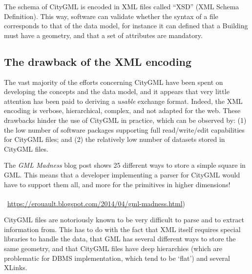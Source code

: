 The schema of CityGML is encoded in XML files called ``XSD'' (XML Schema Definition).
This way, software can validate whether the syntax of a file corresponds to that of the data model, for instance it can defined that a Building must have a geometry, and that a set of attributes are mandatory.




\subsection{The drawback of the XML encoding}

The vast majority of the efforts concerning CityGML have been spent on developing the concepts and the data model, and it appears that very little attention has been paid to deriving a \emph{usable} exchange format.
Indeed, the XML encoding is verbose, hierarchical, complex, and not adapted for the web.
These drawbacks hinder the use of CityGML in practice, which can be observed by: (1) the low number of software packages supporting full read/write/edit capabilities for CityGML files; and (2) the relatively low number of datasets stored in CityGML files.

\begin{kaobox-toread}[frametitle=\faExclamationTriangle\ GML madness]
  The \emph{GML Madness} blog post shows 25 different ways to store a simple square in GML. 
  This means that a developer implementing a parser for CityGML would have to support them all, and more for the primitives in higher dimensions! 
  \\ \\
  \faExternalLink\ \url{https://erouault.blogspot.com/2014/04/gml-madness.html})
\end{kaobox-toread}

CityGML files are notoriously known to be very difficult to parse and to extract information from.
This has to do with the fact that XML itself requires special libraries to handle the data, that GML has several different ways to store the same geometry, and that CityGML files have deep hierarchies (which are problematic for DBMS implementation, which tend to be `flat') and several XLinks.




